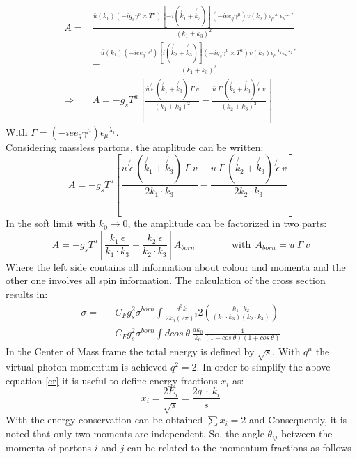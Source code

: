 \begin{equation}
\begin{split}
A = & \frac{\bar{u}(k_1)(-ig_s\gamma^{\nu}\times T^a)[-i(\not{k_1}+\not{k_3})](-iee_q \gamma^{\mu})v(k_2){\epsilon_{\mu}}^{\lambda_1}{\epsilon_{\nu}}^{\lambda_2*}}{(k_1 + k_3)^2}\\ 
&- \frac{\bar{u}(k_1)(-iee_q \gamma^{\mu})[i(\not{k_2}+\not{k_3})](-ig_s\gamma^{\nu}\times T^a)v(k_2){\epsilon_{\mu}}^{\lambda_1}{\epsilon_{\nu}}^{\lambda_2*}}{(k_1 + k_3)^2}\\
\Rightarrow &A=-g_s T^a[ \frac{\bar{u}\:\not{\epsilon}\:(\not{k_1}+\not{k_3})\:\Gamma \:v}{(k_1 + k_3)^2} - \frac{\bar{u}\:\Gamma\:(\not{k_2}+\not{k_3})\:\not{\epsilon} \:v}{(k_2 + k_3)^2}]
\end{split}
\end{equation}
With $\Gamma=(-iee_q \gamma^{\mu}){\epsilon_{\mu}}^{\lambda_1}$.\\
Considering massless partons, the amplitude can be written:
\begin{equation}
 A=-g_s T^a[ \frac{\bar{u}\:\not{\epsilon}\:(\not{k_1}+\not{k_3})\:\Gamma \:v}{2k_1 \cdot k_3} - \frac{\bar{u}\:\Gamma\:(\not{k_2}+\not{k_3})\:\not{\epsilon} \:v}{2k_2 \cdot k_3}]
\end{equation}
In the soft limit with $k_0 \rightarrow 0$, the amplitude can be factorized in two parts:
\begin{equation}
 A=-g_s T^a[ \frac{k_1\:{\epsilon}}{k_1 \cdot k_3} - \frac{k_2\:{\epsilon}}{k_2 \cdot k_3}] A_{born} \:\:\:\:\:\:\:\:\:\:\:\:\:\:\:\:\:\text{with}\:\: A_{born}= \bar{u}\: \Gamma \:v
\end{equation}
Where the left side contains all information about colour and momenta and the other one involves all spin information.
The calculation of the cross section results in:
\begin{equation}
\begin{split}
\sigma=&-C_F g_s^2 \sigma^{born} \int \frac{d^3 k}{2k_0 (2{\pi})^3} 2(\frac{k_1 \cdot k_2}{(k_1 \cdot k_3)(k_2 \cdot k_3)})\\ 
&-C_F g_s^2 \sigma^{born} \int dcos\: \theta\: \frac{d k_0}{k_0} \frac{4}{(1-cos\: \theta)(1+cos\: \theta)}
\label{cr}
\end{split}
\end{equation}
In the Center of Mass frame the total energy is defined by $ \sqrt{s} $. With $ q^{\mu} $ the virtual photon momentum  is achieved $ q^2 =2 $. In order to simplify the above equation \ref{cr} it is useful to define energy fractions $ x_i $ as:
\begin{equation}
x_i = \frac{2E_i}{\sqrt{s}}=\frac{2q\: \cdot\: k_i}{s}
\end{equation}
With the energy conservation can be obtained $ \sum x_i =2  $ and Consequently, it is noted that only two moments are independent. So, the angle $ \theta_{ij} $ between the momenta of partons $ i $ and $ j $ can be related to the momentum fractions as follows \cite{Soper:1996fy}

